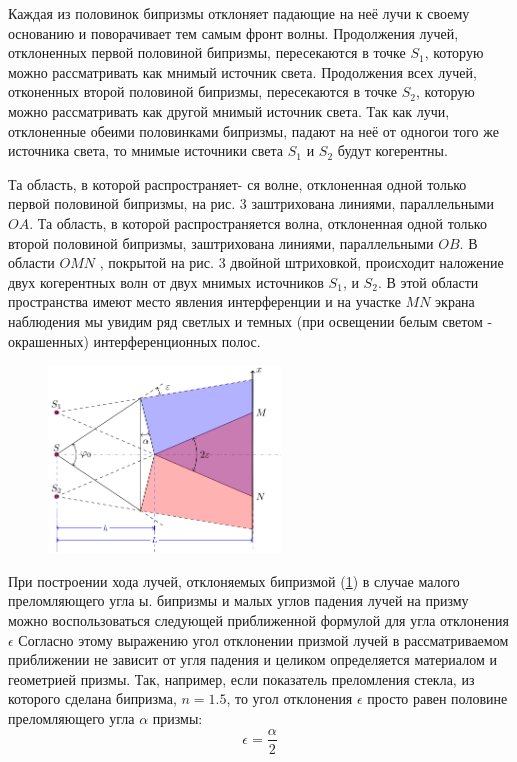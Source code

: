 Каждая из половинок бипризмы отклоняет падающие на неё лучи к своему основанию и поворачивает тем самым фронт волны.  Продолжения лучей, отклоненных первой половиной бипризмы, пересекаются в точке $S_1$, которую можно рассматривать как мнимый источник света. Продолжения всех лучей, отконенных второй половиной бипризмы, пересекаются в точке $S_2$, которую можно рассматривать как другой мнимый источник света. Так как лучи, отклоненные обеими половинками бипризмы, падают на неё от одногои того же источника света, то мнимые источники света $S_1$ и $S_2$ будут когерентны. 

Та область, в которой распространяет- ся волне, отклоненная одной только первой половиной бипризмы, на рис. 3 заштрихована линиями, параллельными $OA$. Та область, в которой распространяется волна, отклоненная одной только второй половиной бипризмы, заштрихована линиями, параллельными $OB$. В области $OMN$ , покрытой на рис. 3 двойной
штриховкой, происходит наложение двух когерентных волн от двух мнимых источников $S_1$, и $S_2$. В этой области пространства имеют место явления интерференции и на участке $MN$ экрана
наблюдения мы увидим ряд светлых и темных (при освещении белым светом - окрашенных) интерференционных полос.

\begin{figure}[H]
	\centering
	\includegraphics[width=0.55\textwidth]{ris/ris3}
	\caption{ }
	\label{fig:ris3}
\end{figure}
При построении хода лучей, отклоняемых бипризмой (\ref{fig:ris3}) в случае малого преломляющего угла ы. бипризмы и малых углов падения лучей на призму можно воспользоваться следующей приближенной формулой для угла отклонения $\epsilon$
Согласно этому выражению угол отклонении призмой лучей в рассматриваемом приближении не зависит от угля падения и целиком определяется материалом и геометрией призмы. Так, например, если показатель преломления стекла, из которого сделана бипризма, $n=1.5$, то угол отклонения $\epsilon$ просто равен половине преломляющего угла $\alpha$ призмы:
\begin{equation}
 	\epsilon=\frac{\alpha}{2}
 \end{equation} 

